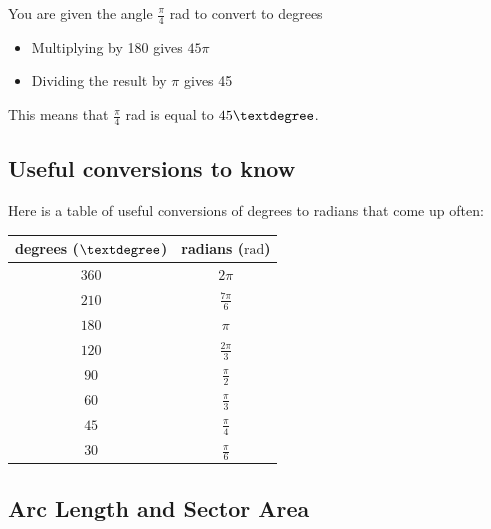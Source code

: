 \documentclass[
  12pt,
  a4paper, oneside]{starmastarticle}
\providecommand{\tightlist}{%
  \setlength{\itemsep}{0pt}\setlength{\parskip}{0pt}}\usepackage{longtable,booktabs,array}
\begin{document}
\begin{tcolorbox}[enhanced jigsaw, bottomrule=.15mm, rightrule=.15mm, breakable, left=2mm, colframe=quarto-callout-note-color-frame, arc=.35mm, toprule=.15mm, colback=white, leftrule=.75mm, opacityback=0]
\begin{minipage}[t]{5.5mm}
\textcolor{quarto-callout-note-color}{\faInfo}
\end{minipage}%
\begin{minipage}[t]{\textwidth - 5.5mm}
You are given the angle \(\frac{\pi}{4}\) rad to convert to degrees

\begin{itemize}
\tightlist
\item
  Multiplying by 180 gives \(45\pi\)
\item
  Dividing the result by \(\pi\) gives 45
\end{itemize}

This means that \(\frac{\pi}{4}\) rad is equal to
\(45\textdegree\).\end{minipage}%
\end{tcolorbox}

\hypertarget{useful-conversions-to-know}{%
\subsection*{Useful conversions to
know}\label{useful-conversions-to-know}}

Here is a table of useful conversions of degrees to radians that come up
often:

\begin{longtable}[]{@{}cc@{}}
\toprule()
degrees (\(\textdegree\)) & radians (\(\textrm{rad}\)) \\
\midrule()
\endhead
\(360\) & \(2 \pi\) \\
\(210\) & \(\frac{7\pi}{6}\) \\
\(180\) & \(\pi\) \\
\(120\) & \(\frac{2\pi}{3}\) \\
\(90\) & \(\frac{\pi}{2}\) \\
\(60\) & \(\frac{\pi}{3}\) \\
\(45\) & \(\frac{\pi}{4}\) \\
\(30\) & \(\frac{\pi}{6}\) \\
\bottomrule()
\end{longtable}

\hypertarget{arc-length-and-sector-area}{%
\subsection{Arc Length and Sector
Area}\label{arc-length-and-sector-area}}
\end{document}
